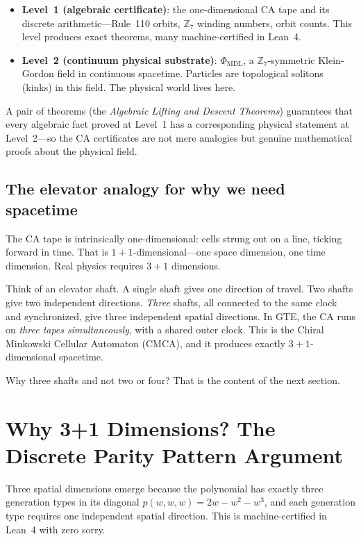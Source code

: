 \documentclass[11pt,a4paper]{article}
\newcommand{\PHIMDL}{\Phi_{\mathrm{MDL}}}
\begin{document}
\begin{itemize}[leftmargin=1.5em]
\item \textbf{Level~1 (algebraic certificate)}: the one-dimensional CA tape and its
  discrete arithmetic---Rule~110 orbits, $\mathbb{Z}_7$ winding numbers, orbit counts.
  This level produces exact theorems, many machine-certified in Lean~4.
\item \textbf{Level~2 (continuum physical substrate)}: $\PHIMDL$, a
  $\mathbb{Z}_7$-symmetric Klein-Gordon field in continuous spacetime.  Particles
  are topological solitons (kinks) in this field.  The physical world lives here.
\end{itemize}

A pair of theorems (the \emph{Algebraic Lifting and Descent Theorems}) guarantees that
every algebraic fact proved at Level~1 has a corresponding physical statement at
Level~2---so the CA certificates are not mere analogies but genuine mathematical
proofs about the physical field.

\subsection{The elevator analogy for why we need spacetime}

The CA tape is intrinsically one-dimensional: cells strung out on a line, ticking
forward in time.  That is $1{+}1$-dimensional---one space dimension, one time
dimension.  Real physics requires $3{+}1$ dimensions.

Think of an elevator shaft.  A single shaft gives one direction of travel.
Two shafts give two independent directions.
\emph{Three} shafts, all connected to the same clock and synchronized, give three
independent spatial directions.
In GTE, the CA runs on \emph{three tapes simultaneously}, with a shared outer clock.
This is the Chiral Minkowski Cellular Automaton (CMCA), and it produces exactly
$3{+}1$-dimensional spacetime.

Why three shafts and not two or four?  That is the content of the next section.

\section{Why 3+1 Dimensions? The Discrete Parity Pattern Argument}

\begin{tcolorbox}[colback=boxorange,colframe=orange!60!black,title=Key theorem]
Three spatial dimensions emerge because the polynomial has exactly three
generation types in its diagonal $p(w,w,w) = 2w - w^2 - w^3$, and each
generation type requires one independent spatial direction.
This is machine-certified in Lean~4 with zero sorry.
\end{tcolorbox}
\end{document}
